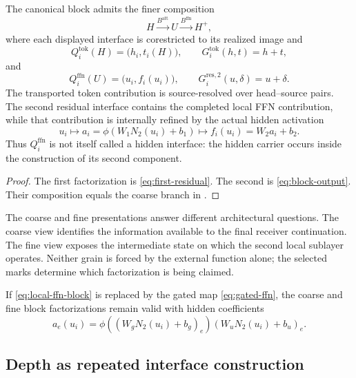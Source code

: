 \begin{corollary}\label{cor:fine-two-stage-block}
The canonical block admits the finer composition
\[
H\xrightarrow{B^{\mathrm{att}}}U\xrightarrow{B^{\mathrm{ffn}}}H^+,
\]
where each displayed interface is corestricted to its realized image and
\[
Q_i^{\mathrm{tok}}(H)=\bigl(h_i,t_i(H)\bigr),
\qquad
G_i^{\mathrm{tok}}(h,t)=h+t,
\]
and
\[
Q_i^{\mathrm{ffn}}(U)=\bigl(u_i,f_i(u_i)\bigr),
\qquad
G_i^{\mathrm{res},2}(u,\delta)=u+\delta.
\]
The transported token contribution is source-resolved over head--source pairs. The second residual interface contains the completed local FFN contribution, while that contribution is internally refined by the actual hidden activation
\[
u_i
\longmapsto
a_i=\phi(W_1N_2(u_i)+b_1)
\longmapsto
f_i(u_i)=W_2a_i+b_2.
\]
Thus $Q_i^{\mathrm{ffn}}$ is not itself called a hidden interface: the hidden carrier occurs inside the construction of its second component.
\end{corollary}

\begin{proof}
The first factorization is \eqref{eq:first-residual}. The second is \eqref{eq:block-output}. Their composition equals the coarse branch in .
\end{proof}

The coarse and fine presentations answer different architectural questions. The coarse view identifies the information available to the final receiver continuation. The fine view exposes the intermediate state on which the second local sublayer operates. Neither grain is forced by the external function alone; the selected marks determine which factorization is being claimed.

\begin{corollary}\label{cor:gated-block}
If \eqref{eq:local-ffn-block} is replaced by the gated map \eqref{eq:gated-ffn}, the coarse and fine block factorizations remain valid with hidden coefficients
\[
a_e(u_i)
=
\phi((W_gN_2(u_i)+b_g)_e)(W_uN_2(u_i)+b_u)_e.
\]
\end{corollary}

\subsection{Depth as repeated interface construction}

